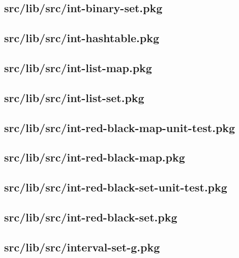 \subsection{src/lib/src/int-binary-set.pkg}


\subsection{src/lib/src/int-hashtable.pkg}


\subsection{src/lib/src/int-list-map.pkg}


\subsection{src/lib/src/int-list-set.pkg}


\subsection{src/lib/src/int-red-black-map-unit-test.pkg}


\subsection{src/lib/src/int-red-black-map.pkg}


\subsection{src/lib/src/int-red-black-set-unit-test.pkg}


\subsection{src/lib/src/int-red-black-set.pkg}


\subsection{src/lib/src/interval-set-g.pkg}


